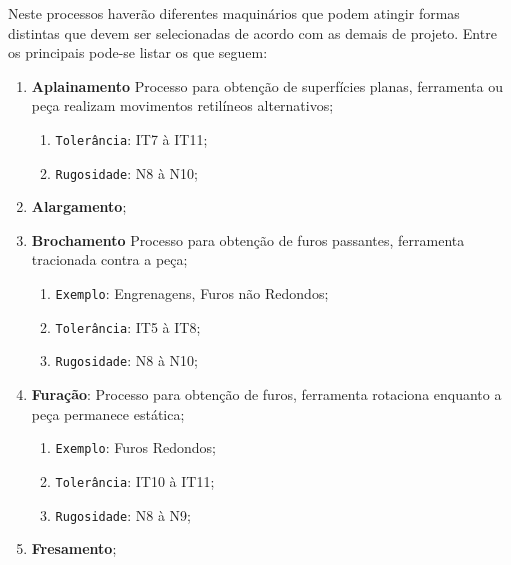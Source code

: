 \documentclass{article}
\begin{document}
            Neste processos haverão diferentes maquinários que podem atingir formas distintas que devem ser selecionadas de acordo com as demais de projeto. Entre os principais pode-se listar os que seguem:
                \begin{enumerate}[rightmargin = \leftmargin]
                    \item \textbf{Aplainamento} Processo para obtenção de superfícies planas, ferramenta ou peça realizam movimentos retilíneos alternativos;
                        \begin{enumerate}[rightmargin = \leftmargin, noitemsep]
                            \item \texttt{Tolerância}: IT7 à IT11;
                            \item \texttt{Rugosidade}: N8 à N10;
                        \end{enumerate}

                    \item \textbf{Alargamento};

                    \item \textbf{Brochamento} Processo para obtenção de furos passantes, ferramenta tracionada contra a peça;
                        \begin{enumerate}[rightmargin = \leftmargin, noitemsep]
                            \item \texttt{Exemplo}: Engrenagens, Furos não Redondos;
                            \item \texttt{Tolerância}: IT5 à IT8;
                            \item \texttt{Rugosidade}: N8 à N10;
                        \end{enumerate}

                    \item \textbf{Furação}: Processo para obtenção de furos, ferramenta rotaciona enquanto a peça permanece estática;
                        \begin{enumerate}[rightmargin = \leftmargin, noitemsep]
                            \item \texttt{Exemplo}: Furos Redondos;
                            \item \texttt{Tolerância}: IT10 à IT11;
                            \item \texttt{Rugosidade}: N8 à N9;
                        \end{enumerate}

                    \item \textbf{Fresamento};


\end{enumerate}
\end{document}
